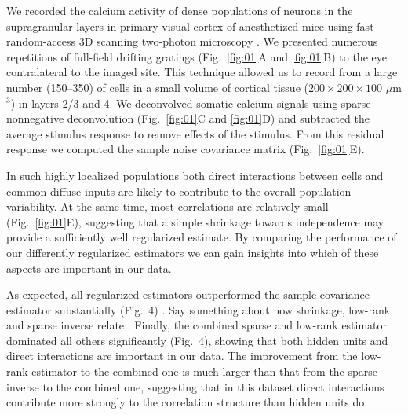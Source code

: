 We recorded the calcium activity of dense populations of neurons in the supragranular layers in primary visual cortex of anesthetized mice using fast random-access 3D scanning two-photon microscopy \cite{Stosiek:2003,Reddy:2005}. We presented numerous repetitions of full-field drifting gratings (Fig.~\ref{fig:01}A and \ref{fig:01}B) to the eye contralateral to the imaged site. This technique allowed us to record from a large number (150--350) of cells in a small volume of cortical tissue ($200\times200\times100$ $\mu$m$^3$) in layers 2/3 and 4. We deconvolved somatic calcium signals using sparse nonnegative deconvolution \cite{Vogelstein:2010} (Fig.~\ref{fig:01}C and \ref{fig:01}D) and subtracted the average stimulus response to remove effects of the stimulus. From this residual response we computed the sample noise covariance matrix (Fig.~\ref{fig:01}E).



In such highly localized populations both direct interactions between cells and common diffuse inputs are likely to contribute to the overall population variability. At the same time, most correlations are relatively small (Fig.~\ref{fig:01}E), suggesting that a simple shrinkage towards independence may provide a sufficiently well regularized estimate. By comparing the performance of our differently regularized estimators we can gain insights into which of these aspects are important in our data.

As expected, all regularized estimators outperformed the sample covariance estimator substantially (Fig.~4) . Say something about how shrinkage, low-rank and sparse inverse relate . Finally, the combined sparse and low-rank estimator dominated all others significantly (Fig.~4), showing that both hidden units and direct interactions are important in our data. The improvement from the low-rank estimator to the combined one is much larger than that from the sparse inverse to the combined one, suggesting that in this dataset direct interactions contribute more strongly to the correlation structure than hidden units do.



